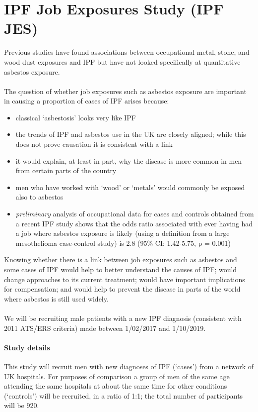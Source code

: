 \documentclass[a4paper,10pt]{article}
\author{Carl Reynolds \\
\small National Heart \& Lung Institute, Imperial College London }
\begin{document}
\section*{\centering IPF Job Exposures Study (IPF JES)}

Previous studies have found associations between occupational metal, stone, and wood dust exposures and IPF but have not looked specifically at quantitative asbestos exposure. \\ \\ The question of whether job exposures such as asbestos exposure are important in causing a proportion of cases of IPF arises because:
\begin{itemize}
 \item classical ‘asbestosis’ looks very like IPF
 \item the trends of IPF and asbestos use in the UK are closely aligned; while this does not prove causation it is consistent with a link
 \item it would explain, at least in part, why the disease is more common in men from certain parts of the country
 \item men who have worked with ‘wood’ or ‘metals’ would commonly be exposed also to asbestos
 \item \textit{preliminary} analysis of occupational data for cases and controls obtained from a recent IPF study shows that the odds ratio associated with ever having had a job where asbestos exposure is likely (using a definition from a large mesothelioma case-control study) is 2.8 (95\% CI: 1.42-5.75, p = 0.001)
\end{itemize}

Knowing whether there is a link between job exposures such as asbestos and some cases of IPF would help to better understand the causes of IPF; would change approaches to its current treatment; would have important implications for compensation; and would help to prevent the disease in parts of the world where asbestos is still used widely. \\ \\ We will be recruiting male patients with a new IPF diagnosis (consistent with 2011 ATS/ERS criteria) made between 1/02/2017 and 1/10/2019. 

\paragraph{Study details}
This study will recruit men with new diagnoses of IPF (‘cases’) from a network of UK hospitals. For purposes of comparison a group of men of the same age attending the same hospitals at about the same time for other conditions (‘controls’) will be recruited, in a ratio of 1:1; the total number of participants will be 920. 
\end{document}
